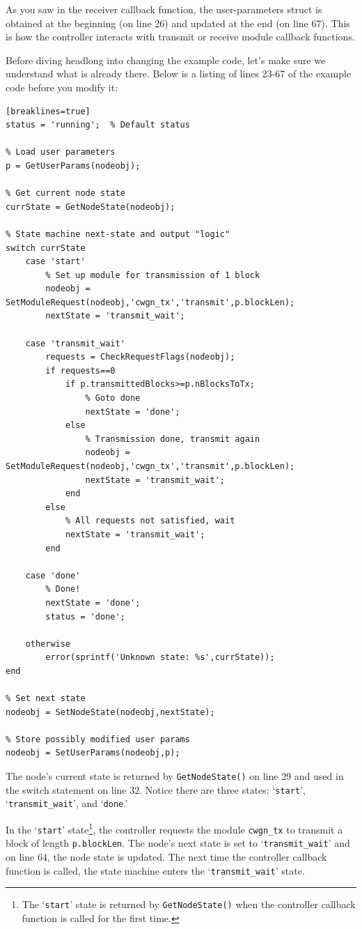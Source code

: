 As you saw in the receiver callback function, the user-parameters struct is obtained at the beginning (on line 26) and updated at the end (on line 67).  This is how the controller interacts with transmit or receive module callback functions.

Before diving headlong into changing the example code, let's make sure we understand what is already there. Below is a listing of lines 23-67 of the example code before you modify it:
%
\begin{lstlisting}[firstnumber=23][breaklines=true]
status = 'running';  % Default status

% Load user parameters
p = GetUserParams(nodeobj);

% Get current node state
currState = GetNodeState(nodeobj);

% State machine next-state and output "logic"
switch currState
    case 'start'
        % Set up module for transmission of 1 block
        nodeobj = SetModuleRequest(nodeobj,'cwgn_tx','transmit',p.blockLen);
        nextState = 'transmit_wait';

    case 'transmit_wait'
        requests = CheckRequestFlags(nodeobj);
        if requests==0
            if p.transmittedBlocks>=p.nBlocksToTx;
                % Goto done
                nextState = 'done';
            else
                % Transmission done, transmit again
                nodeobj = SetModuleRequest(nodeobj,'cwgn_tx','transmit',p.blockLen);
                nextState = 'transmit_wait';
            end
        else
            % All requests not satisfied, wait
            nextState = 'transmit_wait';
        end

    case 'done'
        % Done!
        nextState = 'done';
        status = 'done';

    otherwise
        error(sprintf('Unknown state: %s',currState));
end

% Set next state
nodeobj = SetNodeState(nodeobj,nextState);

% Store possibly modified user params
nodeobj = SetUserParams(nodeobj,p);
\end{lstlisting}
%


The node's current state is returned by \verb+GetNodeState()+ on line 29 and used in the switch statement on line 32.  Notice there are three states: `\verb+start+', `\verb+transmit_wait+', and `\verb+done+.'

In the `\verb+start+' state\footnote{The `{\tt start}' state is returned by {\tt GetNodeState()} when the controller callback function is called for the first time.}, the controller requests the module \verb+cwgn_tx+ to transmit a block of length \verb+p.blockLen+. The node's next state is set to `\verb+transmit_wait+' and on line 64, the node state is updated.  The next time the controller callback function is called, the state machine enters the `\verb+transmit_wait+' state.

